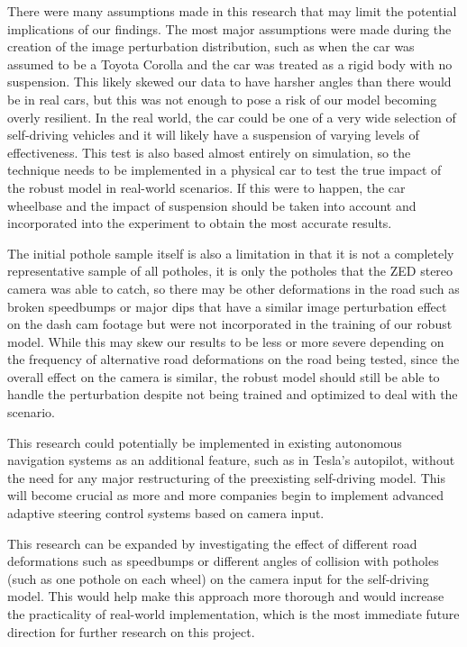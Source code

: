 \documentclass{article}
\begin{document}
There were many assumptions made in this research that may limit the potential implications of our findings. The most major assumptions were made during the creation of the image perturbation distribution, such as when the car was assumed to be a Toyota Corolla and the car was treated as a rigid body with no suspension. This likely skewed our data to have harsher angles than there would be in real cars, but this was not enough to pose a risk of our model becoming overly resilient. In the real world, the car could be one of a very wide selection of self-driving vehicles and it will likely have a suspension of varying levels of effectiveness. This test is also based almost entirely on simulation, so the technique needs to be implemented in a physical car to test the true impact of the robust model in real-world scenarios. If this were to happen, the car wheelbase and the impact of suspension should be taken into account and incorporated into the experiment to obtain the most accurate results.

The initial pothole sample itself is also a limitation in that it is not a completely representative sample of all potholes, it is only the potholes that the ZED stereo camera was able to catch, so there may be other deformations in the road such as broken speedbumps or major dips that have a similar image perturbation effect on the dash cam footage but were not incorporated in the training of our robust model. While this may skew our results to be less or more severe depending on the frequency of alternative road deformations on the road being tested, since the overall effect on the camera is similar, the robust model should still be able to handle the perturbation despite not being trained and optimized to deal with the scenario.

This research could potentially be implemented in existing autonomous navigation systems as an additional feature, such as in Tesla's autopilot, without the need for any major restructuring of the preexisting self-driving model. This will become crucial as more and more companies begin to implement advanced adaptive steering control systems based on camera input.

This research can be expanded by investigating the effect of different road deformations such as speedbumps or different angles of collision with potholes (such as one pothole on each wheel) on the camera input for the self-driving model. This would help make this approach more thorough and would increase the practicality of real-world implementation, which is the most immediate future direction for further research on this project.


\pagebreak


\end{document}
